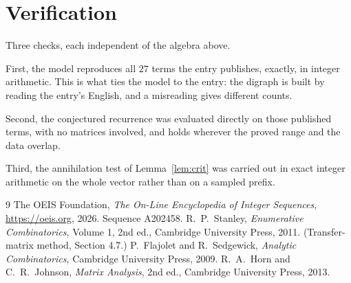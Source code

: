 \documentclass[11pt,a4paper]{article}
\theoremstyle{plain}
\theoremstyle{definition}
\begin{document}
\section{Verification}

Three checks, each independent of the algebra above.

First, the model reproduces all $27$ terms the entry publishes, exactly, in integer
arithmetic. This is what ties the model to the entry: the digraph is built by reading the
entry's English, and a misreading gives different counts.

Second, the conjectured recurrence was evaluated directly on those published terms, with no
matrices involved, and holds wherever the proved range and the data overlap.

Third, the annihilation test of Lemma~\ref{lem:crit} was carried out in exact integer
arithmetic on the whole vector rather than on a sampled prefix.

\begin{thebibliography}{9}
 The OEIS Foundation, \emph{The On-Line Encyclopedia of Integer
Sequences}, \url{https://oeis.org}, 2026. Sequence A202458.
 R.~P.~Stanley, \emph{Enumerative Combinatorics}, Volume 1, 2nd ed.,
Cambridge University Press, 2011. (Transfer-matrix method, Section 4.7.)
 P.~Flajolet and R.~Sedgewick, \emph{Analytic Combinatorics}, Cambridge
University Press, 2009.
 R.~A.~Horn and C.~R.~Johnson, \emph{Matrix Analysis}, 2nd ed., Cambridge
University Press, 2013.
\end{thebibliography}
\end{document}
